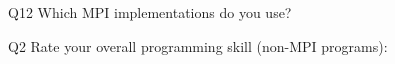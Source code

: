 \begin{description}%
\item{Q12} Which MPI implementations do you use?%
\item{Q2} Rate your overall programming skill (non-MPI programs):%
\end{description}%
